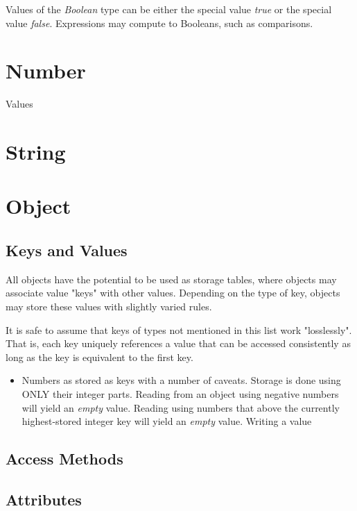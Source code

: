 \documentclass[12pt,letterpaper]{report}
\begin{document}
Values of the \textit{Boolean} type can be either the special value \textit{true} or 
the special value \textit{false}. Expressions may compute to Booleans, such 
as comparisons.





\section{Number}\label{Number}



Values
\section{String}\label{String}
\section{Object}\label{Object}
\subsection{Keys and Values}\label{Keys and Values}

All objects have the potential to be used as storage tables, where objects may associate 
value "keys" with other values. Depending on the type of key, objects may store these values 
with slightly varied rules. 

It is safe to assume that keys of types not mentioned in this list work "losslessly". That is, 
each key uniquely references a value that can be accessed consistently as long as the 
key is equivalent to the first key.

\begin{itemize}
  \item Numbers as stored as keys with a number of caveats. Storage is 
  done using ONLY their integer parts. Reading from an object using negative numbers will yield an \textit{empty} 
  value. Reading using numbers that above the currently highest-stored integer key will yield an 
  \textit{empty} value. Writing a value
\end{itemize}


\subsection{Access Methods}\label{Access Methods}
  
\subsection{Attributes}\label{Attributes}
\end{document}
